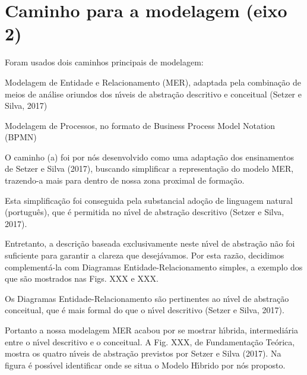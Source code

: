 \documentclass[
12pt,		%
openright,	%
twoside,  %
a4paper,			%
chapter=TITLE,		%
english,			%
french,				%
spanish,			%
brazil				%
]{USPSC-classe/USPSC}
\begin{document}
\section[Caminho para a modelagem (eixo 2)]{Caminho para a modelagem (eixo 2)}\label{Caminho para a modelagem (eixo 2)}
Foram usados dois caminhos principais de modelagem:





\begin{alineas}
\item Modelagem de Entidade e Relacionamento (MER), adaptada pela combina\c{c}\~ao de meios de an\'alise oriundos dos n\'{\i}veis de abstra\c{c}\~ao descritivo e conceitual (Setzer e Silva, 2017)
\item Modelagem de Processos, no formato de Business Process Model Notation (BPMN)
\end{alineas}

O caminho (a) foi por n\'os desenvolvido como uma adapta\c{c}\~ao dos ensinamentos de  Setzer e Silva (2017), buscando simplificar a representa\c{c}\~ao do modelo MER, trazendo-a mais para dentro de nossa zona proximal de forma\c{c}\~ao.




Esta simplifica\c{c}\~ao foi conseguida pela substancial ado\c{c}\~ao de linguagem natural (portugu\^es), que \'e permitida no n\'{\i}vel de abstra\c{c}\~ao descritivo (Setzer e Silva, 2017).




Entretanto, a descri\c{c}\~ao baseada exclusivamente neste n\'{\i}vel de abstra\c{c}\~ao n\~ao foi suficiente para garantir a clareza que desej\'avamos. Por esta raz\~ao, decidimos complement\'a-la com Diagramas Entidade-Relacionamento simples, a exemplo dos que s\~ao mostrados nas Figs. XXX e XXX.




Os Diagramas Entidade-Relacionamento s\~ao pertinentes ao n\'{\i}vel de abstra\c{c}\~ao conceitual, que \'e mais formal do que o n\'{\i}vel descritivo (Setzer e Silva, 2017).




Portanto a nossa modelagem MER acabou por se mostrar h\'{\i}brida, intermedi\'aria entre o n\'{\i}vel descritivo e o conceitual. A Fig. XXX, de Fundamenta\c{c}\~ao Te\'orica, mostra os quatro n\'{\i}veis de abstra\c{c}\~ao previstos por  Setzer e Silva (2017). Na figura \'e poss\'{\i}vel identificar onde se situa o Modelo H\'{\i}brido por n\'os proposto.
\end{document}
